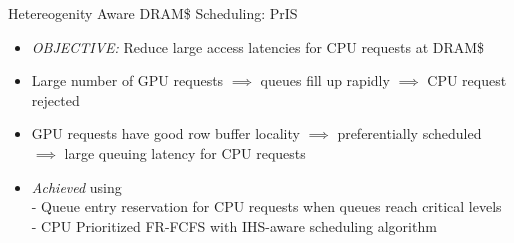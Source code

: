 \documentclass[final,t]{beamer}
\newcommand*\circled[1]{\tikz[baseline=(char.base)]{
            \node[shape=circle,draw,inner sep=2pt] (char) {#1};}}
\begin{document}
\begin{frame}[t,fragile]{}
\begin{columns}[t]
\begin{column}{.48\linewidth}
\begin{tcolorbox}


    \begin{exampleblock}{ \circled{1} Hetereogenity Aware DRAM\$ Scheduling: PrIS}
    \begin{itemize}
    	\item \emph{OBJECTIVE:} Reduce large access latencies for CPU requests at DRAM\$
    	\item Large number of GPU requests $\implies$ queues fill up rapidly $\implies$ CPU request rejected
    	\item GPU requests have good row buffer locality $\implies$ preferentially scheduled $\implies$ large queuing latency for CPU requests
    	\item \emph{Achieved} using \\
    	\qquad - Queue entry reservation for CPU requests when queues reach critical levels \\
    	\qquad - CPU Prioritized FR-FCFS with IHS-aware scheduling algorithm
    \end{itemize} 
	\end{exampleblock}
	    
	\vspace{0.8em}


\end{tcolorbox}
\end{column}
\end{columns}
\end{frame}
\end{document}
